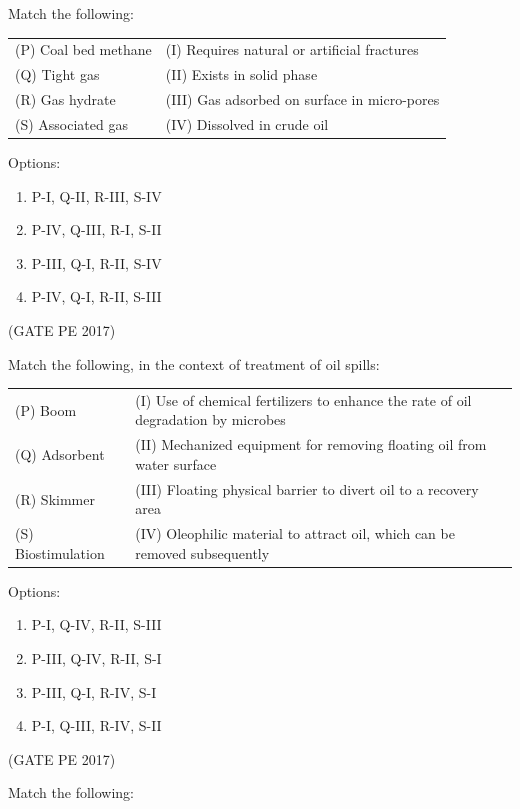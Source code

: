 \documentclass[journal,12pt,onecolumn]{IEEEtran}
\theoremstyle{remark}
\begin{document}
\begin{enumerate}
{\item Match the following:\\

\begin{tabular}{ll}
(P) Coal bed methane & (I) Requires natural or artificial fractures \\
(Q) Tight gas        & (II) Exists in solid phase \\
(R) Gas hydrate      & (III) Gas adsorbed on surface in micro-pores \\
(S) Associated gas   & (IV) Dissolved in crude oil \\
\end{tabular}
Options:
\begin{enumerate}
\item P-I, Q-II, R-III, S-IV  
\item P-IV, Q-III, R-I, S-II  
\item P-III, Q-I, R-II, S-IV  
\item P-IV, Q-I, R-II, S-III  
\end{enumerate}
\hfill{(GATE PE 2017)}

\item Match the following, in the context of treatment of oil spills:\\

\begin{tabular}{ll}
(P) Boom          & (I) Use of chemical fertilizers to enhance the                      rate of oil degradation by microbes \\
(Q) Adsorbent     & (II) Mechanized equipment for removing floating                      oil from water surface \\
(R) Skimmer       & (III) Floating physical barrier to divert oil                        to a recovery area \\
(S) Biostimulation & (IV) Oleophilic material to attract oil, which                       can be removed subsequently \\
\end{tabular}
Options:
\begin{enumerate}
\item P-I, Q-IV, R-II, S-III  
\item P-III, Q-IV, R-II, S-I  
\item P-III, Q-I, R-IV, S-I  
\item P-I, Q-III, R-IV, S-II  
\end{enumerate}
\hfill{(GATE PE 2017)}

\item Match the following:\\

}
\end{enumerate}
\end{document}
